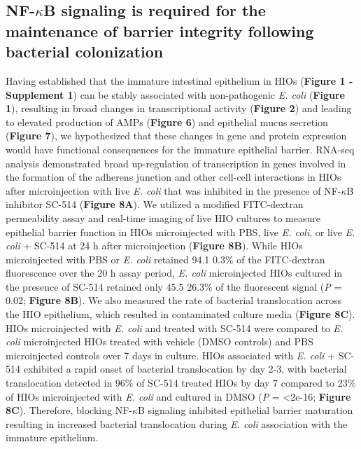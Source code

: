 \documentclass[9pt,lineo]{elife}
\begin{document}
\subsection*{{\bfseries\sffamily } NF-\(\kappa\)B signaling is required for the maintenance of barrier integrity following bacterial colonization}
\label{sec:orgheadline10}
Having established that the immature intestinal epithelium in HIOs (\textbf{Figure 1 - Supplement 1}) can be stably associated with non-pathogenic \emph{E. coli} (\textbf{Figure 1}), resulting in broad changes in transcriptional activity (\textbf{Figure 2}) and leading to elevated production of AMPs (\textbf{Figure 6}) and epithelial mucus secretion (\textbf{Figure 7}), we hypothesized that these changes in gene and protein expression would have functional consequences for the immature epithelial barrier. RNA-seq analysis demonstrated broad up-regulation of transcription in genes involved in the formation of the adherens junction and other cell-cell interactions in HIOs after microinjection with live \emph{E. coli} that was inhibited in the presence of NF-\(\kappa\)B inhibitor SC-514 (\textbf{Figure 8A}). We utilized a modified FITC-dextran permeability assay \citep{Leslie:2015} and real-time imaging of live HIO cultures to measure epithelial barrier function in HIOs microinjected with PBS, live \emph{E. coli}, or live \emph{E. coli} + SC-514 at 24 h after microinjection (\textbf{Figure 8B}). While HIOs microinjected with PBS or \emph{E. coli} retained 94.1 \textpm{} 0.3\% of the FITC-dextran fluorescence over the 20 h assay period, \emph{E. coli} microinjected HIOs cultured in the presence of SC-514 retained only 45.5 \textpm{} 26.3\% of the fluorescent signal (\emph{P} = 0.02; \textbf{Figure 8B}). We also measured the rate of bacterial translocation across the HIO epithelium, which resulted in contaminated culture media (\textbf{Figure 8C}). HIOs microinjected with \emph{E. coli} and treated with SC-514 were compared to \emph{E. coli} microinjected HIOs treated with vehicle (DMSO controls) and PBS microinjected controls over 7 days in culture. HIOs associated with \emph{E. coli} + SC-514 exhibited a rapid onset of bacterial translocation by day 2-3, with bacterial translocation detected in 96\% of SC-514 treated HIOs by day 7 compared to 23\% of HIOs microinjected with \emph{E. coli} and cultured in DMSO (\emph{P} = \num{<2e-16}; \textbf{Figure 8C}). Therefore, blocking NF-\(\kappa\)B signaling inhibited epithelial barrier maturation resulting in increased bacterial translocation during \emph{E. coli} association with the immature epithelium.
\end{document}
